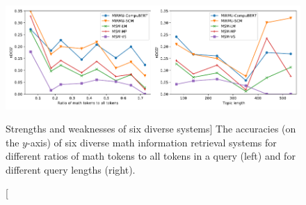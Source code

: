 \begin{figure}
\vspace*{-0.25cm}
\hspace*{-0.025\columnwidth}
\includegraphics[width=1.025\columnwidth]{strengths-and-weaknesses}
\vspace*{-0.8cm}
\caption
  [Strengths and weaknesses of six diverse systems]%
  {The accuracies (on the $y$-axis) of six diverse math information retrieval 
   systems for different ratios of math tokens to all tokens in a query (left)
   and for different query lengths (right). \cite[Figure 8]{novotny2021ensembling}}
\label{fig:strengths-and-weaknesses}
\end{figure}
